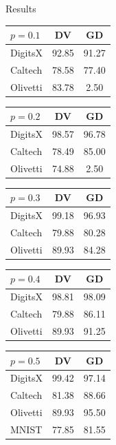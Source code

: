 \documentclass[final,hyperref={pdfpagelabels=false},notheorems]{beamer}
\theoremstyle{thesisstyle}
\begin{document}
\begin{frame}[t]
\begin{columns}[t]
\begin{column}{.505\textwidth}
\begin{block}{Results}
      \begin{table}[h]
        \begin{tabular}{l|c|c}
          $p=0.1$ & DV & GD\\
          \hline
          DigitsX & 92.85 & 91.27\\
          Caltech & 78.58 & 77.40\\
          Olivetti& 83.78 & 2.50\\
        \end{tabular}\hspace{2.5cm}
        \begin{tabular}{l|c|c}
          $p=0.2$ & DV & GD\\
          \hline
          DigitsX & 98.57 & 96.78\\
          Caltech & 78.49 & 85.00\\
          Olivetti& 74.88 & 2.50\\
        \end{tabular}\hspace{2.5cm}
        \begin{tabular}{l|c|c}
          $p=0.3$ & DV & GD\\
          \hline
          DigitsX & 99.18 & 96.93\\
          Caltech & 79.88 & 80.28\\
          Olivetti& 89.93 & 84.28\\
        \end{tabular}\hspace{2.5cm}
        \begin{tabular}{l|c|c}
          $p=0.4$ & DV & GD\\
          \hline
          DigitsX & 98.81 & 98.09\\
          Caltech & 79.88 & 86.11\\
          Olivetti& 89.93 & 91.25\\
        \end{tabular}\hspace{2.5cm}
        \begin{tabular}{l|c|c}
          $p=0.5$ & DV & GD\\
          \hline
          DigitsX & 99.42 & 97.14\\
          Caltech & 81.38 & 88.66\\
          Olivetti& 89.93 & 95.50\\
          MNIST   & 77.85 & 81.55\\
        \end{tabular}\hspace{2.5cm}

\end{table}
\end{block}
\end{column}
\end{columns}
\end{frame}
\end{document}
